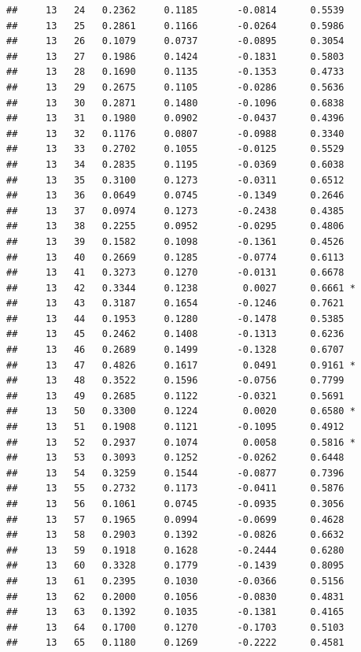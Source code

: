 \documentclass[
]{article}
\begin{document}
\begin{verbatim}
##     13   24   0.2362     0.1185       -0.0814      0.5539  
##     13   25   0.2861     0.1166       -0.0264      0.5986  
##     13   26   0.1079     0.0737       -0.0895      0.3054  
##     13   27   0.1986     0.1424       -0.1831      0.5803  
##     13   28   0.1690     0.1135       -0.1353      0.4733  
##     13   29   0.2675     0.1105       -0.0286      0.5636  
##     13   30   0.2871     0.1480       -0.1096      0.6838  
##     13   31   0.1980     0.0902       -0.0437      0.4396  
##     13   32   0.1176     0.0807       -0.0988      0.3340  
##     13   33   0.2702     0.1055       -0.0125      0.5529  
##     13   34   0.2835     0.1195       -0.0369      0.6038  
##     13   35   0.3100     0.1273       -0.0311      0.6512  
##     13   36   0.0649     0.0745       -0.1349      0.2646  
##     13   37   0.0974     0.1273       -0.2438      0.4385  
##     13   38   0.2255     0.0952       -0.0295      0.4806  
##     13   39   0.1582     0.1098       -0.1361      0.4526  
##     13   40   0.2669     0.1285       -0.0774      0.6113  
##     13   41   0.3273     0.1270       -0.0131      0.6678  
##     13   42   0.3344     0.1238        0.0027      0.6661 *
##     13   43   0.3187     0.1654       -0.1246      0.7621  
##     13   44   0.1953     0.1280       -0.1478      0.5385  
##     13   45   0.2462     0.1408       -0.1313      0.6236  
##     13   46   0.2689     0.1499       -0.1328      0.6707  
##     13   47   0.4826     0.1617        0.0491      0.9161 *
##     13   48   0.3522     0.1596       -0.0756      0.7799  
##     13   49   0.2685     0.1122       -0.0321      0.5691  
##     13   50   0.3300     0.1224        0.0020      0.6580 *
##     13   51   0.1908     0.1121       -0.1095      0.4912  
##     13   52   0.2937     0.1074        0.0058      0.5816 *
##     13   53   0.3093     0.1252       -0.0262      0.6448  
##     13   54   0.3259     0.1544       -0.0877      0.7396  
##     13   55   0.2732     0.1173       -0.0411      0.5876  
##     13   56   0.1061     0.0745       -0.0935      0.3056  
##     13   57   0.1965     0.0994       -0.0699      0.4628  
##     13   58   0.2903     0.1392       -0.0826      0.6632  
##     13   59   0.1918     0.1628       -0.2444      0.6280  
##     13   60   0.3328     0.1779       -0.1439      0.8095  
##     13   61   0.2395     0.1030       -0.0366      0.5156  
##     13   62   0.2000     0.1056       -0.0830      0.4831  
##     13   63   0.1392     0.1035       -0.1381      0.4165  
##     13   64   0.1700     0.1270       -0.1703      0.5103  
##     13   65   0.1180     0.1269       -0.2222      0.4581  

\end{verbatim}
\end{document}
